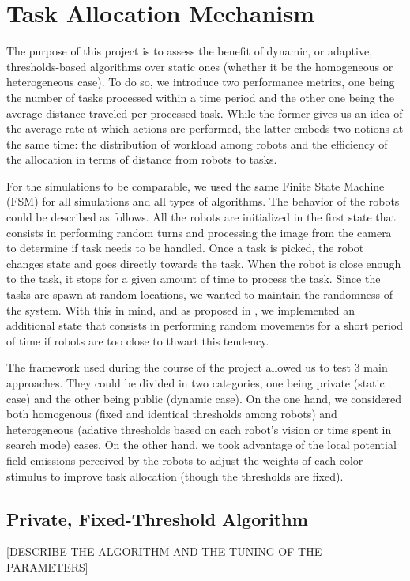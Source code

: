\chapter{Task Allocation Mechanism}
The purpose of this project is to assess the benefit of dynamic, or adaptive, thresholds-based algorithms over static ones (whether it be the homogeneous or heterogeneous case). To do so, we introduce two performance metrics, one being the number of tasks processed within a time period and the other one being the average distance traveled per processed task. While the former gives us an idea of the average rate at which actions are performed, the latter embeds two notions at the same time: the distribution of workload among robots and the efficiency of the allocation in terms of distance from robots to tasks.

For the simulations to be comparable, we used the same Finite State Machine (FSM) for all simulations and all types of algorithms. The behavior of the robots could be described as follows. All the robots are initialized in the first state that consists in performing random turns and processing the image from the camera to determine if task needs to be handled. Once a task is picked, the robot changes state and goes directly towards the task. When the robot is close enough to the task, it stops for a given amount of time to process the task. Since the tasks are spawn at random locations, we wanted to maintain the randomness of the system. With this in mind, and as proposed in \cite{kalra}, we implemented an additional state that consists in performing random movements for a short period of time if robots are too close to thwart this tendency.

The framework used during the course of the project allowed us to test 3 main approaches. They could be divided in two categories, one being private (static case) and the other being public (dynamic case). On the one hand, we considered both homogenous (fixed and identical thresholds among robots) and heterogeneous (adative thresholds based on each robot's vision or time spent in search mode) cases. On the other hand, we took advantage of the local potential field emissions perceived by the robots to adjust the weights of each color stimulus to improve task allocation (though the thresholds are fixed).

\section{Private, Fixed-Threshold Algorithm}
[DESCRIBE THE ALGORITHM AND THE TUNING OF THE PARAMETERS]
